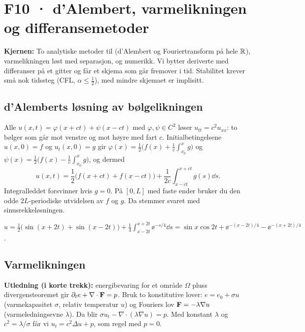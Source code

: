 \section{F10 · d'Alembert, varmelikningen og differansemetoder}

\textbf{Kjernen:} To analytiske metoder til (d'Alembert og Fouriertransform på hele $\mathbb{R}$), varmelikningen løst med separasjon, og numerikk. Vi bytter deriverte med differanser på et gitter og får et skjema som går fremover i tid. Stabilitet krever små nok tidssteg (CFL, $\alpha\le\frac12$), med mindre skjemaet er implisitt.

\subsection{d'Alemberts løsning av bølgelikningen}
\begin{teorem}[d'Alembert]
Alle $u(x,t)=\varphi(x+ct)+\psi(x-ct)$ med $\varphi,\psi\in C^2$ løser $u_{tt}=c^2u_{xx}$: to bølger som går mot venstre og mot høyre med fart $c$. Initialbetingelsene $u(x,0)=f$ og $u_t(x,0)=g$ gir $\varphi(x)=\frac12\bigl(f(x)+\frac1c\int_{x_0}^xg\bigr)$ og $\psi(x)=\frac12\bigl(f(x)-\frac1c\int_{x_0}^xg\bigr)$, og dermed
\[
u(x,t)=\frac12\bigl(f(x+ct)+f(x-ct)\bigr)+\frac1{2c}\int_{x-ct}^{x+ct}g(s)\dd s .
\]
Integralleddet forsvinner hvis $g=0$. På $[0,L]$ med faste ender bruker du den odde $2L$-periodiske utvidelsen av $f$ og $g$. Da stemmer svaret med sinusrekkeløsningen.
\end{teorem}
\begin{eksempel}[øving 10, oppg.~1: $c=2$, $f=\sin x$, $g=\ee^{-x/4}$ (kontrollregnet)]
$u=\frac12\bigl(\sin(x+2t)+\sin(x-2t)\bigr)+\frac14\int_{x-2t}^{x+2t}\ee^{-s/4}\dd s=\sin x\cos2t+\ee^{-(x-2t)/4}-\ee^{-(x+2t)/4}$.
\end{eksempel}



\subsection{Varmelikningen}
\textbf{Utledning (i korte trekk):} energibevaring for et område $\Omega$ pluss divergensteoremet gir $\partial_te+\nabla\cdot\mathbf{F}=p$. Bruk to konstitutive lover: $e=e_0+\sigma u$ (varmekapasitet $\sigma$, relativ temperatur $u$) og Fouriers lov $\mathbf{F}=-\lambda\nabla u$ (varmeledningsevne $\lambda$). Da blir $\sigma u_t-\nabla\cdot(\lambda\nabla u)=p$. Med konstant $\lambda$ og $c^2=\lambda/\sigma$ får vi $u_t=c^2\Delta u+p$, som regel med $p=0$.

